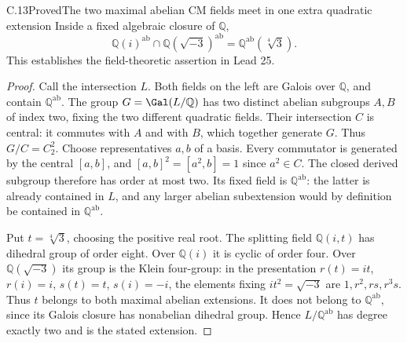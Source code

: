 \begin{statement}{C.13}{Proved}{The two maximal abelian CM fields meet in one extra quadratic extension}
Inside a fixed algebraic closure of $\mathbb Q$,
\[
 \mathbb Q(i)^{\mathrm{ab}}\cap
 \mathbb Q(\sqrt{-3})^{\mathrm{ab}}
          =\mathbb Q^{\mathrm{ab}}(\sqrt[4]{3}).
\]
This establishes the field-theoretic assertion in Lead 25.
\end{statement}
\begin{proof}
Call the intersection $L$. Both fields on the left are Galois over
$\mathbb Q$, and contain $\mathbb Q^{\mathrm{ab}}$. The group
$G=\Gal(L/\mathbb Q)$ has two distinct abelian subgroups $A,B$ of
index two, fixing the two different quadratic fields. Their
intersection $C$ is central: it commutes with $A$ and with $B$,
which together generate $G$. Thus $G/C=C_2^2$. Choose representatives
$a,b$ of a basis. Every commutator is generated by the central
$[a,b]$, and $[a,b]^2=[a^2,b]=1$ since $a^2\in C$.
The closed derived subgroup therefore has order at most two.
Its fixed field is $\mathbb Q^{\mathrm{ab}}$: the latter is already
contained in $L$, and any larger abelian subextension would by
definition be contained in $\mathbb Q^{\mathrm{ab}}$.

Put $t=\sqrt[4]{3}$, choosing the positive real root. The splitting
field $\mathbb Q(i,t)$ has dihedral group of order eight. Over
$\mathbb Q(i)$ it is cyclic of order four. Over
$\mathbb Q(\sqrt{-3})$ its group is the Klein four-group: in the
presentation $r(t)=it$, $r(i)=i$, $s(t)=t$, $s(i)=-i$, the elements
fixing $it^2=\sqrt{-3}$ are $1,r^2,rs,r^3s$.
Thus $t$ belongs to both maximal abelian extensions. It does not
belong to $\mathbb Q^{\mathrm{ab}}$, since its Galois closure has
nonabelian dihedral group. Hence $L/\mathbb Q^{\mathrm{ab}}$ has
degree exactly two and is the stated extension.
\end{proof}

